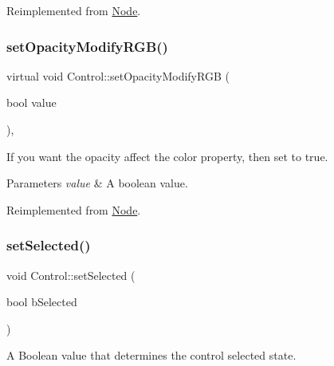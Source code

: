 Reimplemented from \hyperlink{classNode_a978c5435ab23f76e9efdf0f7e9e288e5}{Node}.

\mbox{\label{classControl_afc69bf17ee302a8efd9db70d5bb4c5b7}} 
\subsubsection{\texorpdfstring{set\+Opacity\+Modify\+R\+G\+B()}{setOpacityModifyRGB()}\hspace{0.1cm}{\footnotesize\ttfamily [2/2]}}
{\footnotesize\ttfamily virtual void Control\+::set\+Opacity\+Modify\+R\+GB (\begin{DoxyParamCaption}\item[{bool}]{value }\end{DoxyParamCaption})\hspace{0.3cm}{\ttfamily [override]}, {\ttfamily [virtual]}}

If you want the opacity affect the color property, then set to true. 
\begin{DoxyParams}{Parameters}
{\em value} & A boolean value. \\
\hline
\end{DoxyParams}


Reimplemented from \hyperlink{classNode_a978c5435ab23f76e9efdf0f7e9e288e5}{Node}.

\mbox{\label{classControl_ab35419d8bb194f540e838a3b796258a7}} 
\subsubsection{\texorpdfstring{set\+Selected()}{setSelected()}\hspace{0.1cm}{\footnotesize\ttfamily [1/2]}}
{\footnotesize\ttfamily void Control\+::set\+Selected (\begin{DoxyParamCaption}\item[{bool}]{b\+Selected }\end{DoxyParamCaption})\hspace{0.3cm}{\ttfamily [virtual]}}

A Boolean value that determines the control selected state. 


